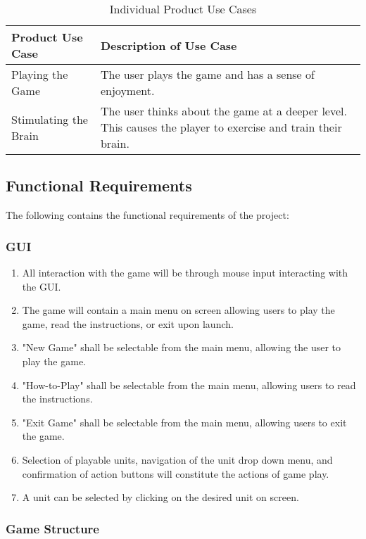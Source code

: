 \documentclass{article}
\begin{document}
\begin{table}[H]
\begin{tabularx}{\textwidth}{lX}
    \toprule
    Product Use Case & Description of Use Case \\
    \midrule
    Playing the Game & The user plays the game and has a sense of enjoyment. \\
    Stimulating the Brain & The user thinks about the game at a deeper level. This causes the player to exercise and train their brain. \\
    \bottomrule
\end{tabularx}
\caption{Individual Product Use Cases}
\end{table}

\subsection{Functional Requirements}

The following contains the functional requirements of the project:

\subsubsection{GUI} \label{GUI}

\begin{enumerate}
    \item All interaction with the game will be through mouse input interacting with the GUI.
    \item The game will contain a main menu on screen allowing users to play the game, read the instructions, or exit upon launch.
    \item "New Game" shall be selectable from the main menu, allowing the user to play the game.
    \item "How-to-Play" shall be selectable from the main menu, allowing users to read the instructions.
    \item "Exit Game" shall be selectable from the main menu, allowing users to exit the game.
    \item Selection of playable units, navigation of the unit drop down menu, and confirmation of action buttons will constitute the actions of game play.
    \item A unit can be selected by clicking on the desired unit on screen.
\end{enumerate}

\subsubsection{Game Structure} \label{gameStructure}
\end{document}

